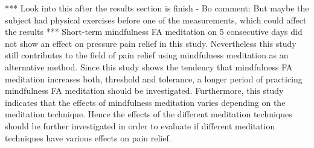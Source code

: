 *** Look into this after the results section is finish - Bo comment: But maybe the subject had physical exercises before one of the measurements, which could affect the results ***
Short-term mindfulness FA meditation on 5 consecutive days did not show an effect on pressure pain relief in this study. Nevertheless this study still contributes to the field of pain relief using mindfulness meditation as an alternative method. Since this study shows the tendency that mindfulness FA meditation increases both, threshold and tolerance, a longer period of practicing mindfulness FA meditation should be investigated. Furthermore, this study indicates that the effects of mindfulness meditation varies depending on the meditation technique. Hence the effects of the different meditation techniques should be further investigated in order to evaluate if different meditation techniques have various effects on pain relief. 